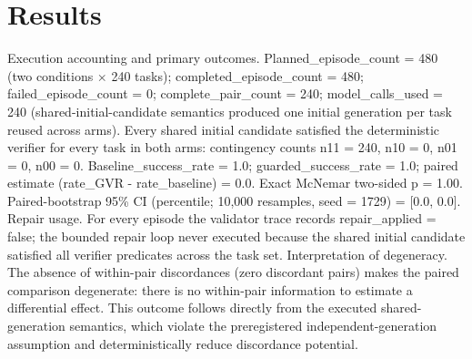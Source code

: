 \documentclass[conference]{IEEEtran}
\begin{document}
\section{Results}
Execution accounting and primary outcomes. Planned\_episode\_count = 480 (two conditions \ensuremath{\times} 240 tasks); completed\_episode\_count = 480; failed\_episode\_count = 0; complete\_pair\_count = 240; model\_calls\_used = 240 (shared-initial-candidate semantics produced one initial generation per task reused across arms). Every shared initial candidate satisfied the deterministic verifier for every task in both arms: contingency counts n11 = 240, n10 = 0, n01 = 0, n00 = 0. Baseline\_success\_rate = 1.0; guarded\_success\_rate = 1.0; paired estimate (rate\_GVR - rate\_baseline) = 0.0. Exact McNemar two-sided p = 1.00. Paired-bootstrap 95\% CI (percentile; 10,000 resamples, seed = 1729) = [0.0, 0.0]. Repair usage. For every episode the validator trace records repair\_applied = false; the bounded repair loop never executed because the shared initial candidate satisfied all verifier predicates across the task set. Interpretation of degeneracy. The absence of within-pair discordances (zero discordant pairs) makes the paired comparison degenerate: there is no within-pair information to estimate a differential effect. This outcome follows directly from the executed shared-generation semantics, which violate the preregistered independent-generation assumption and deterministically reduce discordance potential.
\end{document}
